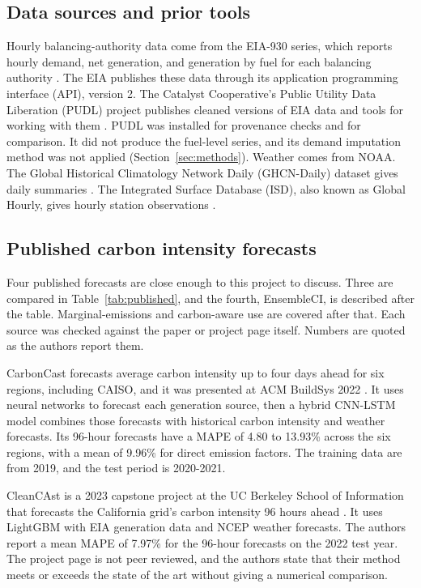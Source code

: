 \documentclass[10pt,journal,compsoc]{IEEEtran}
\begin{document}
\subsection{Data sources and prior tools}
Hourly balancing-authority data come from the EIA-930 series, which reports hourly demand, net generation, and generation by fuel for each balancing authority \cite{eia930}. The EIA publishes these data through its application programming interface (API), version 2. The Catalyst Cooperative's Public Utility Data Liberation (PUDL) project publishes cleaned versions of EIA data and tools for working with them \cite{pudl}. PUDL was installed for provenance checks and for comparison. It did not produce the fuel-level series, and its demand imputation method was not applied (Section~\ref{sec:methods}). Weather comes from NOAA. The Global Historical Climatology Network Daily (GHCN-Daily) dataset gives daily summaries \cite{menne2012}. The Integrated Surface Database (ISD), also known as Global Hourly, gives hourly station observations \cite{smith2011}.

\subsection{Published carbon intensity forecasts}
Four published forecasts are close enough to this project to discuss. Three are compared in Table~\ref{tab:published}, and the fourth, EnsembleCI, is described after the table. Marginal-emissions and carbon-aware use are covered after that. Each source was checked against the paper or project page itself. Numbers are quoted as the authors report them.

CarbonCast forecasts average carbon intensity up to four days ahead for six regions, including CAISO, and it was presented at ACM BuildSys 2022 \cite{carboncast2022}. It uses neural networks to forecast each generation source, then a hybrid CNN-LSTM model combines those forecasts with historical carbon intensity and weather forecasts. Its 96-hour forecasts have a MAPE of 4.80 to 13.93\% across the six regions, with a mean of 9.96\% for direct emission factors. The training data are from 2019, and the test period is 2020-2021.

CleanCAst is a 2023 capstone project at the UC Berkeley School of Information that forecasts the California grid's carbon intensity 96 hours ahead \cite{cleancast2023}. It uses LightGBM with EIA generation data and NCEP weather forecasts. The authors report a mean MAPE of 7.97\% for the 96-hour forecasts on the 2022 test year. The project page is not peer reviewed, and the authors state that their method meets or exceeds the state of the art without giving a numerical comparison.
\end{document}
